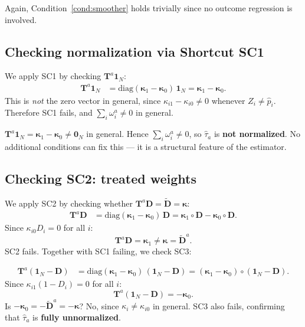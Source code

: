 \documentclass[12pt, a4paper]{article}
\theoremstyle{condstyle}
\theoremstyle{plain}
\newcommand{\bone}{\mathbf{1}_N}
\newcommand{\bzero}{\mathbf{0}_N}
\newcommand{\that}[1]{\hat{\tau}_{#1}}
\newcommand{\phat}{\hat{p}}
\begin{document}
Again, Condition~\ref{cond:smoother} holds trivially since no outcome regression is involved.

\subsection{Checking normalization via Shortcut SC1}

We apply SC1 by checking $\mathbf{T}^a\bone$:
\begin{align*}
  \mathbf{T}^a\bone
  &= \mathrm{diag}(\boldsymbol{\kappa}_1 - \boldsymbol{\kappa}_0)\,\bone
   = \boldsymbol{\kappa}_1 - \boldsymbol{\kappa}_0.
\end{align*}
This is \emph{not} the zero vector in general,
since $\kappa_{i1} - \kappa_{i0} \neq 0$ whenever $Z_i \neq \phat_i$.
Therefore SC1 fails, and $\sum_i \omega_i^a \neq 0$ in general.

\begin{keyresult}[$\that{a}$ is not normalized]
$\mathbf{T}^a\bone = \boldsymbol{\kappa}_1 - \boldsymbol{\kappa}_0 \neq \bzero$
in general.
Hence $\sum_i \omega_i^a \neq 0$, so $\that{a}$ is \textbf{not normalized}.
No additional conditions can fix this --- it is a structural feature of the estimator.
\end{keyresult}

\subsection{Checking SC2: treated weights}

We apply SC2 by checking whether $\mathbf{T}^a\mathbf{D} = \tilde{\mathbf{D}} = \boldsymbol{\kappa}$:
\begin{align*}
  \mathbf{T}^a\mathbf{D}
  &= \mathrm{diag}(\boldsymbol{\kappa}_1 - \boldsymbol{\kappa}_0)\,\mathbf{D}
   = \boldsymbol{\kappa}_1\circ\mathbf{D} - \boldsymbol{\kappa}_0\circ\mathbf{D}.
\end{align*}
Since $\kappa_{i0}D_i = 0$ for all $i$:
\[
  \mathbf{T}^a\mathbf{D} = \boldsymbol{\kappa}_1 \neq \boldsymbol{\kappa} = \tilde{\mathbf{D}}^a.
\]
SC2 fails. Together with SC1 failing, we check SC3:

\begin{align*}
  \mathbf{T}^a(\bone - \mathbf{D})
  &= \mathrm{diag}(\boldsymbol{\kappa}_1 - \boldsymbol{\kappa}_0)\,(\bone - \mathbf{D})
   = (\boldsymbol{\kappa}_1 - \boldsymbol{\kappa}_0)\circ(\bone - \mathbf{D}).
\end{align*}
Since $\kappa_{i1}(1-D_i) = 0$ for all $i$:
\[
  \mathbf{T}^a(\bone - \mathbf{D}) = -\boldsymbol{\kappa}_0.
\]
Is $-\boldsymbol{\kappa}_0 = -\tilde{\mathbf{D}}^a = -\boldsymbol{\kappa}$?
No, since $\kappa_i \neq \kappa_{i0}$ in general.
SC3 also fails, confirming that $\that{a}$ is \textbf{fully unnormalized}.
\end{document}
